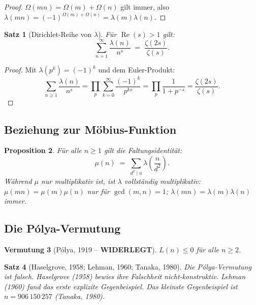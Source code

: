 \documentclass[12pt,a4paper]{amsart}
\newtheorem{theorem}{Satz}[section]
\newtheorem{proposition}[theorem]{Proposition}
\newtheorem{vermutung}[theorem]{Vermutung}
\theoremstyle{definition}
\begin{document}
\begin{proof}
$\Omega(mn) = \Omega(m) + \Omega(n)$ gilt immer, also
$\lambda(mn) = (-1)^{\Omega(m)+\Omega(n)} = \lambda(m)\lambda(n)$.
\end{proof}

\begin{theorem}[Dirichlet-Reihe von $\lambda$]
\label{satz:liouville-dirichlet}
Für $\operatorname{Re}(s) > 1$ gilt:
\[
  \sum_{n=1}^{\infty} \frac{\lambda(n)}{n^s}
  \;=\; \frac{\zeta(2s)}{\zeta(s)}.
\]
\end{theorem}

\begin{proof}
Mit $\lambda(p^k) = (-1)^k$ und dem Euler-Produkt:
\[
  \sum_{n \ge 1}\frac{\lambda(n)}{n^s}
  = \prod_p \sum_{k=0}^{\infty}\frac{(-1)^k}{p^{ks}}
  = \prod_p \frac{1}{1+p^{-s}}
  = \frac{\zeta(2s)}{\zeta(s)}.
\]
\end{proof}

\subsection{Beziehung zur Möbius-Funktion}

\begin{proposition}
\label{prop:lambda-mu}
Für alle $n \ge 1$ gilt die Faltungsidentität:
\[
  \mu(n) \;=\; \sum_{d^2 \mid n} \lambda\!\left(\frac{n}{d^2}\right).
\]
Während $\mu$ nur \emph{multiplikativ} ist, ist $\lambda$ \emph{vollständig}
multiplikativ: $\mu(mn)=\mu(m)\mu(n)$ nur für $\gcd(m,n)=1$;
$\lambda(mn)=\lambda(m)\lambda(n)$ immer.
\end{proposition}

\subsection{Die Pólya-Vermutung}

\begin{vermutung}[Pólya, 1919 -- \textbf{WIDERLEGT}]
\label{verm:polya}
$L(n) \le 0$ für alle $n \ge 2$.
\end{vermutung}

\begin{theorem}[Haselgrove, 1958; Lehman, 1960; Tanaka, 1980]
\label{satz:haselgrove}
Die Pólya-Vermutung ist \emph{falsch}.  Haselgrove (1958) bewies ihre
Falschheit nicht-konstruktiv.  Lehman (1960) fand das erste explizite
Gegenbeispiel.  Das kleinste Gegenbeispiel ist $n = 906\,150\,257$
(Tanaka, 1980).
\end{theorem}
\end{document}
